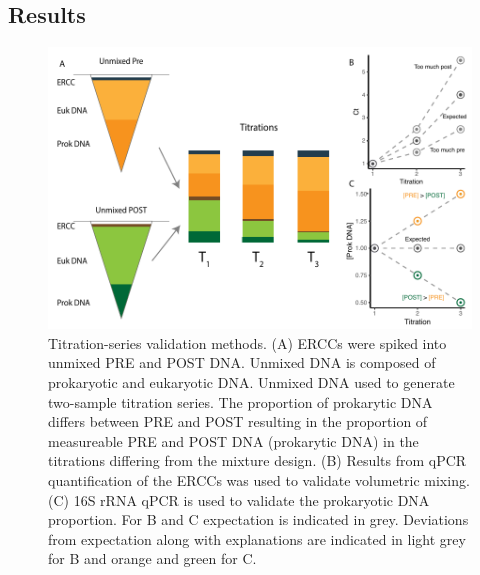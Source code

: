 \documentclass[12pt]{article}
\begin{document}
\subsection*{Results}

\begin{figure}
\centering
\includegraphics[width=0.9\linewidth]{titration_validation.pdf}
\caption{\label{fig:titrationValidation} Titration-series validation methods. (A) ERCCs were spiked into unmixed PRE and POST DNA. Unmixed DNA is composed of prokaryotic and eukaryotic DNA. Unmixed DNA used to generate two-sample titration series. The proportion of prokarytic DNA differs between PRE and POST resulting in the proportion of measureable PRE and POST DNA (prokarytic DNA) in the titrations differing from the mixture design. (B) Results from qPCR quantification of the ERCCs was used to validate volumetric mixing. (C) 16S rRNA qPCR is used to validate the prokaryotic DNA proportion. For B and C expectation is indicated in grey. Deviations from expectation along with explanations are indicated in light grey for B and orange and green for C.}
\end{figure}
\end{document}
